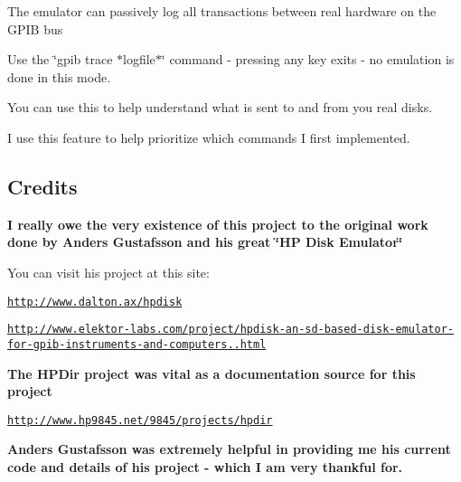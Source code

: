\begin{DoxyItemize}
\begin{DoxyItemize}
\begin{DoxyItemize}
\begin{DoxyItemize}
\end{DoxyItemize}
\item The emulator can passively log all transactions between real hardware on the G\+P\+IB bus
\begin{DoxyItemize}
\item Use the \char`\"{}gpib trace $\ast$logfile$\ast$\char`\"{} command -\/ pressing any key exits -\/ no emulation is done in this mode.
\item You can use this to help understand what is sent to and from you real disks.
\item I use this feature to help prioritize which commands I first implemented. 


\end{DoxyItemize}
\end{DoxyItemize}
\end{DoxyItemize}
\end{DoxyItemize}

\subsection*{Credits}

{\bfseries I really owe the very existence of this project to the original work done by Anders Gustafsson and his great \char`\"{}\+H\+P Disk Emulator\char`\"{} }
\begin{DoxyItemize}
\item You can visit his project at this site\+:
\begin{DoxyItemize}
\item \href{http://www.dalton.ax/hpdisk}{\tt http\+://www.\+dalton.\+ax/hpdisk}
\item \href{http://www.elektor-labs.com/project/hpdisk-an-sd-based-disk-emulator-for-gpib-instruments-and-computers.13693.html}{\tt http\+://www.\+elektor-\/labs.\+com/project/hpdisk-\/an-\/sd-\/based-\/disk-\/emulator-\/for-\/gpib-\/instruments-\/and-\/computers..\+html}
\end{DoxyItemize}
\end{DoxyItemize}

{\bfseries  The H\+P\+Dir project was vital as a documentation source for this project}
\begin{DoxyItemize}
\item \href{http://www.hp9845.net/9845/projects/hpdir}{\tt http\+://www.\+hp9845.\+net/9845/projects/hpdir}
\end{DoxyItemize}

{\bfseries Anders Gustafsson was extremely helpful in providing me his current code and details of his project -\/ which I am very thankful for.}

